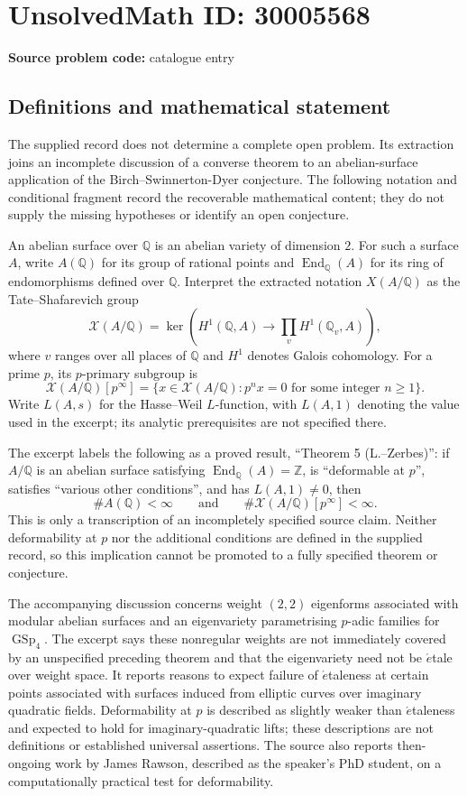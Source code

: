 \documentclass[11pt]{article}
\newcommand{\Z}{\mathbb{Z}}
\newcommand{\Q}{\mathbb{Q}}
\begin{document}
\section*{UnsolvedMath ID: 30005568}
\textbf{Source problem code:} catalogue entry
\subsection{Definitions and mathematical statement}
The supplied record does not determine a complete open problem. Its extraction joins an incomplete discussion of a converse theorem to an abelian-surface application of the Birch--Swinnerton-Dyer conjecture. The following notation and conditional fragment record the recoverable mathematical content; they do not supply the missing hypotheses or identify an open conjecture.

An abelian surface over \(\Q\) is an abelian variety of dimension \(2\). For such a surface \(A\), write \(A(\Q)\) for its group of rational points and \(\operatorname{End}_{\Q}(A)\) for its ring of endomorphisms defined over \(\Q\). Interpret the extracted notation \(X(A/\Q)\) as the Tate--Shafarevich group
\[
\mathcal{X}(A/\Q)=\ker\!\left(H^1(\Q,A)\longrightarrow\prod_v H^1(\Q_v,A)\right),
\]
where \(v\) ranges over all places of \(\Q\) and \(H^1\) denotes Galois cohomology. For a prime \(p\), its \(p\)-primary subgroup is
\[
\mathcal{X}(A/\Q)[p^\infty]=\{x\in\mathcal{X}(A/\Q):p^n x=0\text{ for some integer }n\geq 1\}.
\]
Write \(L(A,s)\) for the Hasse--Weil \(L\)-function, with \(L(A,1)\) denoting the value used in the excerpt; its analytic prerequisites are not specified there.

The excerpt labels the following as a proved result, ``Theorem 5 (L.--Zerbes)'': if \(A/\Q\) is an abelian surface satisfying \(\operatorname{End}_{\Q}(A)=\Z\), is ``deformable at \(p\)'', satisfies ``various other conditions'', and has \(L(A,1)\ne 0\), then
\[
\#A(\Q)<\infty
\qquad\text{and}\qquad
\#\mathcal{X}(A/\Q)[p^\infty]<\infty.
\]
This is only a transcription of an incompletely specified source claim. Neither deformability at \(p\) nor the additional conditions are defined in the supplied record, so this implication cannot be promoted to a fully specified theorem or conjecture.

The accompanying discussion concerns weight \((2,2)\) eigenforms associated with modular abelian surfaces and an eigenvariety parametrising \(p\)-adic families for \(\operatorname{GSp}_4\). The excerpt says these nonregular weights are not immediately covered by an unspecified preceding theorem and that the eigenvariety need not be \(\acute{e}\)tale over weight space. It reports reasons to expect failure of \(\acute{e}\)taleness at certain points associated with surfaces induced from elliptic curves over imaginary quadratic fields. Deformability at \(p\) is described as slightly weaker than \(\acute{e}\)taleness and expected to hold for imaginary-quadratic lifts; these descriptions are not definitions or established universal assertions. The source also reports then-ongoing work by James Rawson, described as the speaker's PhD student, on a computationally practical test for deformability.
\end{document}
